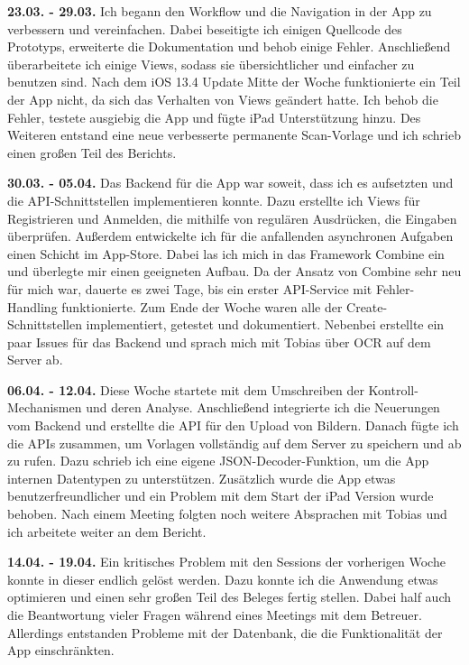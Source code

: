 \documentclass[notables, nomenclature, oneside, 150]{HSMW-Thesis}
\begin{document}
	\textbf{23.03. - 29.03.} 
	Ich begann den Workflow und die Navigation in der App zu verbessern und vereinfachen. Dabei beseitigte ich einigen Quellcode des Prototyps, erweiterte die Dokumentation und behob einige Fehler. Anschließend überarbeitete ich einige Views, sodass sie übersichtlicher und einfacher zu benutzen sind. Nach dem iOS 13.4 Update Mitte der Woche funktionierte ein Teil der App nicht, da sich das Verhalten von Views geändert hatte. Ich behob die Fehler, testete ausgiebig die App und fügte iPad Unterstützung hinzu. Des Weiteren entstand eine neue verbesserte permanente Scan-Vorlage und ich schrieb einen großen Teil des Berichts.
	
	\textbf{30.03. - 05.04.} 
	Das Backend für die App war soweit, dass ich es aufsetzten und die API-Schnittstellen implementieren konnte. Dazu erstellte ich Views für Registrieren und Anmelden, die mithilfe von regulären Ausdrücken, die Eingaben überprüfen. Außerdem entwickelte ich für die anfallenden asynchronen Aufgaben einen Schicht im App-Store. Dabei las ich mich in das Framework Combine ein und überlegte mir einen geeigneten Aufbau. Da der Ansatz von Combine sehr neu für mich war, dauerte es zwei Tage, bis ein erster API-Service mit Fehler-Handling funktionierte. Zum Ende der Woche waren alle der Create-Schnittstellen implementiert, getestet und dokumentiert. Nebenbei erstellte ein paar Issues für das Backend und sprach mich mit Tobias über OCR auf dem Server ab.
	
	\textbf{06.04. - 12.04.}
	Diese Woche startete mit dem Umschreiben der Kontroll-Mechanismen und deren Analyse. Anschließend integrierte ich die Neuerungen vom Backend und erstellte die API für den Upload von Bildern. Danach fügte ich die APIs zusammen, um Vorlagen vollständig auf dem Server zu speichern und ab zu rufen. Dazu schrieb ich eine eigene JSON-Decoder-Funktion, um die App internen Datentypen zu unterstützen. Zusätzlich wurde die App etwas benutzerfreundlicher und ein Problem mit dem Start der iPad Version wurde behoben. Nach einem Meeting folgten noch weitere Absprachen mit Tobias und ich arbeitete weiter an dem Bericht.
	
	\textbf{14.04. - 19.04.}
	Ein kritisches Problem mit den Sessions der vorherigen Woche konnte in dieser endlich gelöst werden. Dazu konnte ich die Anwendung etwas optimieren und einen sehr großen Teil des Beleges fertig stellen. Dabei half auch die Beantwortung vieler Fragen während eines Meetings mit dem Betreuer. Allerdings entstanden Probleme mit der Datenbank, die die Funktionalität der App einschränkten.
	
\end{document}
